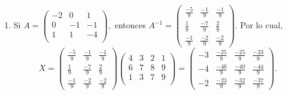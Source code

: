 \begin{prob}
\begin{myproof}
\begin{enumerate}[$(a)$]
\item Si $A=\left( \begin{array}{ccc}
-2&0&1\\
0&-1&-1\\
1&1&-4\\
\end{array} \right),$ entonces $A^{-1}=\begin{pmatrix}
\frac{-5}{9} & \frac{-1}{9} & \frac{-1}{9} \\
\frac{1}{9} & \frac{-7}{9} & \frac{2}{9} \\
\frac{-1}{9} & \frac{-2}{9} & \frac{-2}{9}
\end{pmatrix}.$ Por lo cual, 
$$X=\begin{pmatrix}
\frac{-5}{9} & \frac{-1}{9} & \frac{-1}{9} \\
\frac{1}{9} & \frac{-7}{9} & \frac{2}{9} \\
\frac{-1}{9} & \frac{-2}{9} & \frac{-2}{9}
\end{pmatrix}\left( \begin{array}{cccc}
4&3&2&1\\
6&7&8&9\\
1&3&7&9\\
\end{array} \right)=\begin{pmatrix}
-3 & \frac{-25}{9} & \frac{-25}{9} & \frac{-23}{9} \\
-4 & \frac{-40}{9} & \frac{-40}{9} & \frac{-44}{9} \\
-2 & \frac{-23}{9} & \frac{-32}{9} & \frac{-37}{9}
\end{pmatrix}.$$
\end{enumerate}
\end{myproof}
\end{prob}

